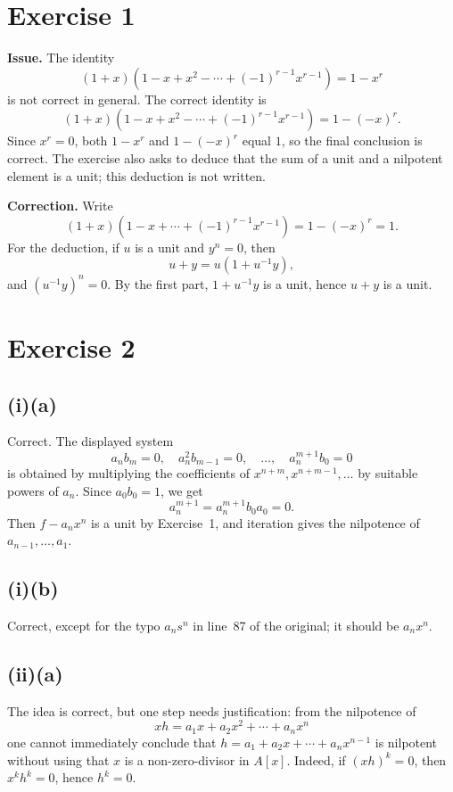 \documentclass[11pt]{article}
\begin{document}
\section*{Exercise 1}

\textbf{Issue.}  The identity
\[
(1+x)(1-x+x^2-\cdots+(-1)^{r-1}x^{r-1})=1-x^r
\]
is not correct in general.  The correct identity is
\[
(1+x)(1-x+x^2-\cdots+(-1)^{r-1}x^{r-1})=1-(-x)^r.
\]
Since \(x^r=0\), both \(1-x^r\) and \(1-(-x)^r\) equal \(1\), so the final
conclusion is correct.  The exercise also asks to deduce that the sum of a unit
and a nilpotent element is a unit; this deduction is not written.

\textbf{Correction.}  Write
\[
(1+x)(1-x+\cdots+(-1)^{r-1}x^{r-1})=1-(-x)^r=1.
\]
For the deduction, if \(u\) is a unit and \(y^n=0\), then
\[
u+y=u(1+u^{-1}y),
\]
and \((u^{-1}y)^n=0\).  By the first part, \(1+u^{-1}y\) is a unit, hence
\(u+y\) is a unit.

\section*{Exercise 2}

\subsection*{(i)(a)}
Correct.  The displayed system
\[
a_nb_m=0,\quad a_n^2b_{m-1}=0,\quad\ldots,\quad a_n^{m+1}b_0=0
\]
is obtained by multiplying the coefficients of \(x^{n+m},x^{n+m-1},\ldots\)
by suitable powers of \(a_n\).  Since \(a_0b_0=1\), we get
\[
a_n^{m+1}=a_n^{m+1}b_0a_0=0.
\]
Then \(f-a_nx^n\) is a unit by Exercise~1, and iteration gives the
nilpotence of \(a_{n-1},\ldots,a_1\).

\subsection*{(i)(b)}
Correct, except for the typo \(a_ns^n\) in line~87 of the original; it should
be \(a_nx^n\).

\subsection*{(ii)(a)}
The idea is correct, but one step needs justification: from the nilpotence of
\[
xh=a_1x+a_2x^2+\cdots+a_nx^n
\]
one cannot immediately conclude that \(h=a_1+a_2x+\cdots+a_nx^{n-1}\) is
nilpotent without using that \(x\) is a non-zero-divisor in \(A[x]\).  Indeed,
if \((xh)^k=0\), then \(x^kh^k=0\), hence \(h^k=0\).
\end{document}
